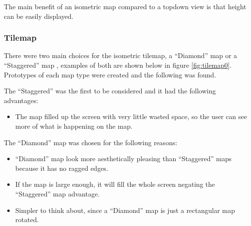 The main benefit of an isometric map compared to a topdown view is that height can be easily displayed. 

\subsubsection{Tilemap}
\label{sub:tilemap}

There were two main choices for the isometric tilemap, a ``Diamond'' map or a  ``Staggered'' map \cite{isometric_game_programming}, examples of both are shown below in figure \ref{fig:tilemap0}. Prototypes of each map type were created and the following was found.  

The ``Staggered'' was the first to be considered and it had the following advantages:
\begin{itemize}
	\item The map filled up the screen with very little wasted space, so the user can see more of what is happening on the map. 
\end{itemize}

The ``Diamond'' map was chosen for the following reasons:
\begin{itemize}
	\item ``Diamond'' map look more aesthetically pleasing than ``Staggered'' maps because it has no ragged edges.
	\item  If the map is large enough, it will fill the whole screen negating the ``Staggered'' map advantage.
	\item  Simpler to think about, since a ``Diamond'' map is just a rectangular map rotated.
\end{itemize}


